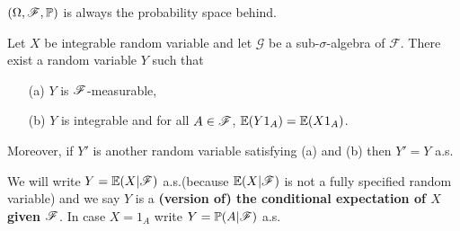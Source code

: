 \documentclass[12pt,a4paper]{report}
\begin{document}
$(\Omega, \mathscr{F},\mathbb{P})$ is always the probability space behind.
\s

 Let $X$ be integrable random variable and let $\mathscr{G}$ be a sub-$\sigma$-algebra of $\mathscr{F}$. There exist a random variable $Y$ such that
\begin{itemize}
\item[(a)] $Y$ is $\mathscr{F}$-measurable,
\item[(b)] $Y$ is integrable and for all $A \in \mathscr{F}$, $\mathbb{E}(Y1_A) = \mathbb{E}(X1_A)$.
\end{itemize}
Moreover, if $Y'$ is another random variable satisfying (a) and (b) then $Y'=Y$ a.s.
\s

We will write $Y = \mathbb{E}(X | \mathscr{F})$ a.s.(because $\mathbb{E}(X|\mathscr{F})$ is not a fully specified random variable) and we say $Y$ is a \textbf{(version of) the conditional expectation of $X$ given $\mathscr{F}$}. In case $X = 1_A$ write $Y=\mathbb{P}(A|\mathscr{F})$ a.s.
\s
\end{document}
